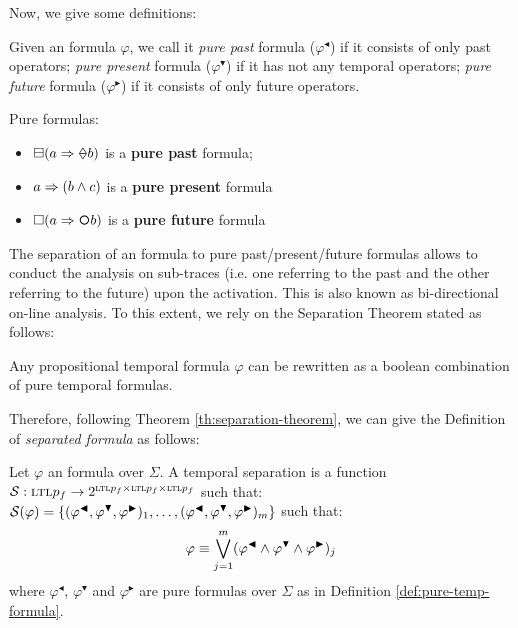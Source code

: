 Now, we give some definitions:
\begin{definition}\citep{gabbay1989declarative}\label{def:pure-temp-formula}
Given an \LTLp formula $\varphi$, we call it \emph{pure past} formula ($\varphi^\blacktriangleleft$) if it consists of only past operators; \emph{pure present} formula ($\varphi^\blacktriangledown$) if it has not any temporal operators; \emph{pure future} formula ($\varphi^\blacktriangleright$) if it consists of only future operators.
\end{definition}
\begin{example}\label{ex:pure-formulas-examples}
Pure formulas:
\begin{itemize}
\item $\boxminus(a \Rightarrow \Once b)$ is a \textbf{pure past} formula;
\item $a \Rightarrow (b \lAND c)$ is a \textbf{pure present} formula
\item $\Box(a \Rightarrow \Next b)$ is a \textbf{pure future} formula
\end{itemize}
\end{example}
The separation of an \LTLp formula to pure past/present/future formulas allows to conduct the analysis on sub-traces (i.e. one referring to the past and the other referring to the future) upon the activation. This is also known as bi-directional on-line analysis. To this extent, we rely on the Separation Theorem stated as follows:
\begin{theorem}\citep{gabbay1989declarative}\label{th:separation-theorem}
Any propositional temporal formula $\varphi$ can be rewritten as a boolean combination of pure temporal formulas.
\end{theorem}
Therefore, following Theorem \ref{th:separation-theorem}, we can give the Definition of \textit{separated formula} as follows:
\begin{definition}\citep{cecconi2018interestingness}\label{def:separated-formula}
Let  $\varphi$ an \LTLp formula over $\Sigma$. A temporal separation is a function $\S: \textsc{ltl}p_f  \rightarrow 2^{\textsc{ltl}p_f \times \textsc{ltl}p_f 	\times \textsc{ltl}p_f}$ such that: $\S(\varphi) = \{(\varphi^{\blacktriangleleft},\varphi^{\blacktriangledown},\varphi^{\blacktriangleright})_1,\dots,\\(\varphi^{\blacktriangleleft},\varphi^{\blacktriangledown},\varphi^{\blacktriangleright})_m\}$ such that:
\begin{equation}\label{eq:separated-formulas}
\varphi \equiv \bigvee^{m}_{j=1} (\varphi^{\blacktriangleleft} \lAND \varphi^{\blacktriangledown} \lAND \varphi^{\blacktriangleright})_j
\end{equation}
where $\varphi^\blacktriangleleft$, $\varphi^\blacktriangledown$ and $\varphi^\blacktriangleright$ are pure formulas over $\Sigma$ as in Definition \ref{def:pure-temp-formula}.
\end{definition}
